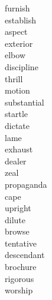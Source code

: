 \documentclass[a4paper, 11pt]{ctexart}
\begin{document}
\clearpage

\begin{multicols*}{3}
    \begin{description}

\item[furnish]

\item[establish]

\item[aspect]

\item[exterior]

\item[elbow]

\item[discipline]

\item[thrill]

\item[motion]

\item[substantial]

\item[startle]

\item[dictate]

\item[lame]

\item[exhaust]

\item[dealer]

\item[zeal]

\item[propaganda]

\item[cape]

\item[upright]

\item[dilute]

\item[browse]

\item[tentative]

\item[descendant]

\item[brochure]

\item[rigorous]

\item[worship]


\end{description}
\end{multicols*}
\end{document}
